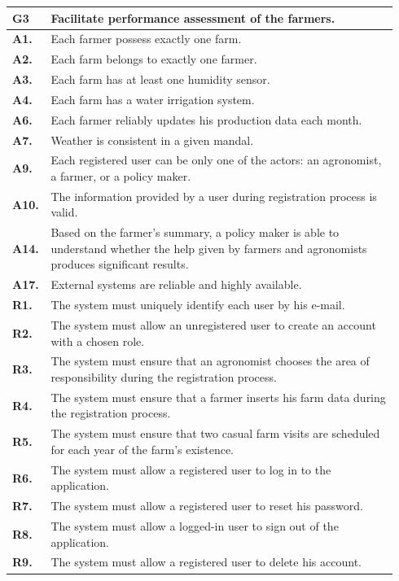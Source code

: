 \begin{longtable}{p{0.06\linewidth} p{0.88\linewidth}} 
    \toprule
    \textbf{G3} & Facilitate performance assessment of the farmers. \\ 
    \midrule
    \textbf{A1.} & Each farmer possess exactly one farm.\\
    \textbf{A2.} & Each farm belongs to exactly one farmer.\\ 
    \textbf{A3.} & Each farm has at least one humidity sensor.\\ 
    \textbf{A4.} & Each farm has a water irrigation system.\\ 
    \textbf{A6.} & Each farmer reliably updates his production data each month.\\ 
    \textbf{A7.} & Weather is consistent in a given mandal.\\     
    \textbf{A9.} & Each registered user can be only one of the actors: an agronomist, a farmer, or a policy maker.\\ 
    \textbf{A10.} & The information provided by a user during registration process is valid.\\ 
    \textbf{A14.} & Based on the farmer's summary, a policy maker is able to understand whether the help given by farmers and agronomists produces significant results.\\ 
    \textbf{A17.} & External systems are reliable and highly available.\\
    \midrule
    
	\textbf{R1.} & The system must uniquely identify each user by his e-mail. \\
	\textbf{R2.} & The system must allow an unregistered user to create an account with a chosen role. \\
	\textbf{R3.} & The system must ensure that an agronomist chooses the area of responsibility during the registration process. \\
	\textbf{R4.} & The system must ensure that a farmer inserts his farm data during the registration process.\\
	\textbf{R5.} & The system must ensure that two casual farm visits are scheduled for each year of the farm's existence.\\
	\textbf{R6.} & The system must allow a registered user to log in to the application. \\
	\textbf{R7.} & The system must allow a registered user to reset his password. \\
	\textbf{R8.} & The system must allow a logged-in user to sign out of the application. \\
	\textbf{R9.} & The system must allow a registered user to delete his account. \\
	

\end{longtable}
